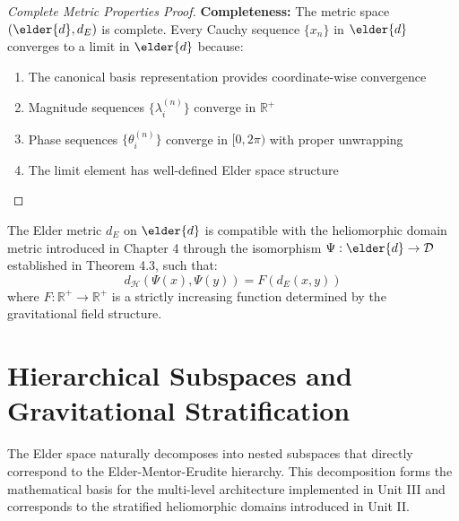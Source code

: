 \begin{proof}[Complete Metric Properties Proof]
\textbf{Completeness:} The metric space $(\elder{d}, d_E)$ is complete. Every Cauchy sequence $\{x_n\}$ in $\elder{d}$ converges to a limit in $\elder{d}$ because:
\begin{enumerate}
    \item The canonical basis representation provides coordinate-wise convergence
    \item Magnitude sequences $\{\lambda_i^{(n)}\}$ converge in $\mathbb{R}^+$
    \item Phase sequences $\{\theta_i^{(n)}\}$ converge in $[0, 2\pi)$ with proper unwrapping
    \item The limit element has well-defined Elder space structure
\end{enumerate}
\end{proof}

\begin{proposition}
The Elder metric $d_E$ on $\elder{d}$ is compatible with the heliomorphic domain metric introduced in Chapter 4 through the isomorphism $\Psi: \elder{d} \rightarrow \mathcal{D}$ established in Theorem 4.3, such that:
\begin{equation}
d_{\mathcal{H}}(\Psi(x), \Psi(y)) = F(d_E(x, y))
\end{equation}
where $F: \mathbb{R}^+ \rightarrow \mathbb{R}^+$ is a strictly increasing function determined by the gravitational field structure.
\end{proposition}

\section{Hierarchical Subspaces and Gravitational Stratification}

The Elder space naturally decomposes into nested subspaces that directly correspond to the Elder-Mentor-Erudite hierarchy. This decomposition forms the mathematical basis for the multi-level architecture implemented in Unit III and corresponds to the stratified heliomorphic domains introduced in Unit II.

